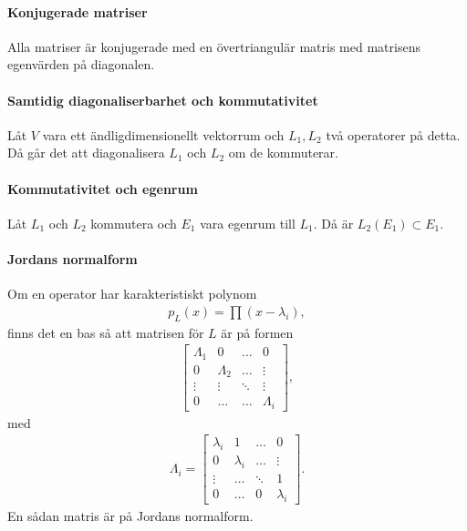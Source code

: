 \proof

\paragraph{Konjugerade matriser}
Alla matriser är konjugerade med en övertriangulär matris med matrisens egenvärden på diagonalen.

\paragraph{Samtidig diagonaliserbarhet och kommutativitet}
Låt $V$ vara ett ändligdimensionellt vektorrum och $L_{1}, L_{2}$ två operatorer på detta. Då går det att diagonalisera $L_{1}$ och $L_{2}$ om de kommuterar.

\proof

\paragraph{Kommutativitet och egenrum}
Låt $L_{1}$ och $L_{2}$ kommutera och $E_{1}$ vara egenrum till $L_{1}$. Då är $L_{2}(E_{1})\subset E_{1}$.

\proof

\paragraph{Jordans normalform}
Om en operator har karakteristiskt polynom
\begin{align*}
	p_{L}(x) = \prod (x - \lambda_{i}),
\end{align*}
finns det en bas så att matrisen för $L$ är på formen
\begin{align*}
	\left[\begin{array}{cccc}
		\Lambda_{1} & 0           & \dots  & 0 \\
		0           & \Lambda_{2} & \dots  & \vdots \\
		\vdots      & \vdots      & \ddots & \vdots \\
		0           & \dots       & \dots  & \Lambda_{i}
	\end{array}\right],
\end{align*}
med 
\begin{align*}
	\Lambda_{i} =
	\left[\begin{array}{cccc}
		\lambda_{i} & 1           & \dots       & 0 \\
		0           & \lambda_{i} & \dots       & \vdots \\
		\vdots      & \dots       & \ddots      & 1 \\
		0           & \dots       & 0           & \lambda_{i}
	\end{array}\right].
\end{align*}
En sådan matris är på Jordans normalform.

\proof